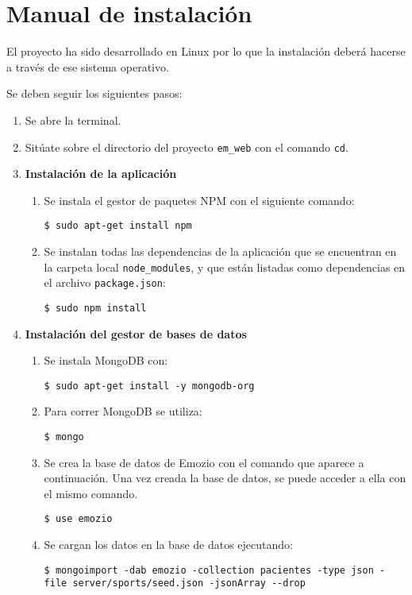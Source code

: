 \chapter{Manual de instalación}

El proyecto ha sido desarrollado en Linux por lo que la instalación deberá hacerse a través de ese sistema operativo. 


Se deben seguir los siguientes pasos:

\begin{enumerate}
\item Se abre la terminal.
\item Sitúate sobre el directorio del proyecto \texttt{em\_web} con el comando \texttt{cd}.
\item \textbf{Instalación de la aplicación}
\begin{enumerate}
\item Se instala el gestor de paquetes NPM con el siguiente comando:
	\begin{lstlisting}[style=consola, numbers=none]
	$ sudo apt-get install npm
	\end{lstlisting}
\item Se instalan todas las dependencias de la aplicación que se encuentran en la carpeta local \texttt{node\_modules}, y que están listadas como dependencias en el archivo \texttt{package.json}:
	\begin{lstlisting}[style=consola, numbers=none]
	$ sudo npm install
	\end{lstlisting}
\end{enumerate}
\item \textbf{Instalación del gestor de bases de datos}
\begin{enumerate}
\item Se instala MongoDB con:
	\begin{lstlisting}[style=consola, numbers=none]
	$ sudo apt-get install -y mongodb-org
	\end{lstlisting}
\item Para correr MongoDB se utiliza:
	\begin{lstlisting}[style=consola, numbers=none]
	$ mongo
	\end{lstlisting}
\item Se crea la base de datos de Emozio con el comando que aparece a continuación. Una vez creada la base de datos, se puede acceder a ella con el mismo comando.
	\begin{lstlisting}[style=consola, numbers=none]
	$ use emozio
	\end{lstlisting}
\item Se cargan los datos en la base de datos ejecutando:
	\begin{lstlisting}[style=consola, numbers=none]
$ mongoimport -dab emozio -collection pacientes -type json -file server/sports/seed.json -jsonArray --drop
	

\end{lstlisting}
\end{enumerate}
\end{enumerate}
